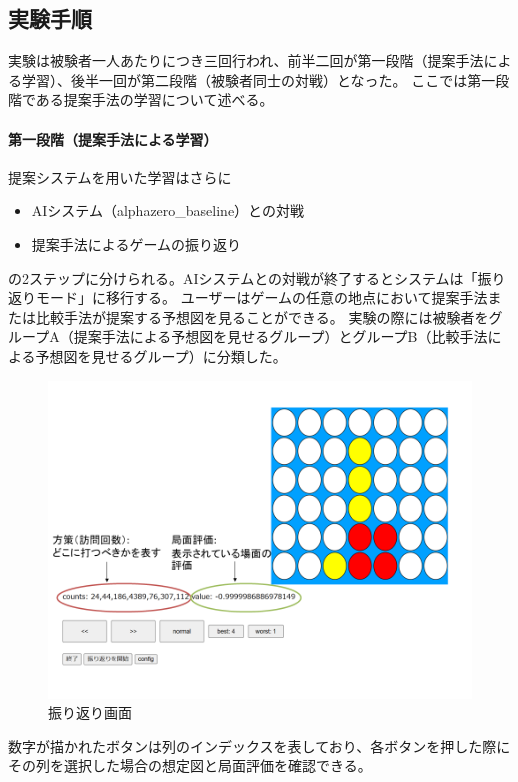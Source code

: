\subsection{実験手順}
実験は被験者一人あたりにつき三回行われ、前半二回が第一段階（提案手法による学習）、後半一回が第二段階（被験者同士の対戦）となった。
ここでは第一段階である提案手法の学習について述べる。
\paragraph{第一段階（提案手法による学習）}
提案システムを用いた学習はさらに
\begin{itemize}
	\item AIシステム（alphazero\_baseline）との対戦
	\item 提案手法によるゲームの振り返り
\end{itemize}
の2ステップに分けられる。AIシステムとの対戦が終了するとシステムは「振り返りモード」に移行する。
ユーザーはゲームの任意の地点において提案手法または比較手法が提案する予想図を見ることができる。
実験の際には被験者をグループA（提案手法による予想図を見せるグループ）とグループB（比較手法による予想図を見せるグループ）に分類した。
\begin{figure}[t]
	\centering
	\includegraphics[width=\linewidth]{./figure/lookBack.png}
	\caption{振り返り画面}
	\label{fig:lookBack}
\end{figure}
数字が描かれたボタンは列のインデックスを表しており、各ボタンを押した際にその列を選択した場合の想定図と局面評価を確認できる。
